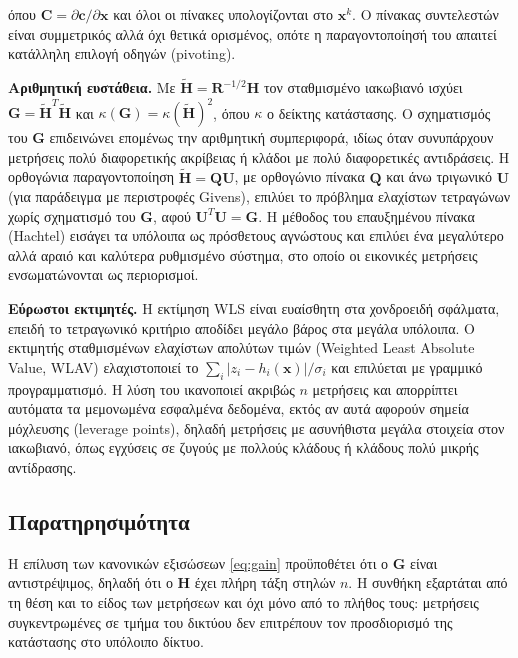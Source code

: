όπου $\mathbf{C} = \partial\mathbf{c}/\partial\mathbf{x}$ και όλοι οι πίνακες υπολογίζονται στο
$\mathbf{x}^{k}$. Ο πίνακας συντελεστών είναι συμμετρικός αλλά όχι θετικά ορισμένος, οπότε η
παραγοντοποίησή του απαιτεί κατάλληλη επιλογή οδηγών (pivoting).

\textbf{Αριθμητική ευστάθεια.} Με $\tilde{\mathbf{H}} = \mathbf{R}^{-1/2}\mathbf{H}$ τον
σταθμισμένο ιακωβιανό ισχύει $\mathbf{G} = \tilde{\mathbf{H}}^{T}\tilde{\mathbf{H}}$ και
$\kappa(\mathbf{G}) = \kappa(\tilde{\mathbf{H}})^2$, όπου $\kappa$ ο δείκτης κατάστασης. Ο
σχηματισμός του $\mathbf{G}$ επιδεινώνει επομένως την αριθμητική συμπεριφορά, ιδίως όταν
συνυπάρχουν μετρήσεις πολύ διαφορετικής ακρίβειας ή κλάδοι με πολύ διαφορετικές αντιδράσεις.
Η ορθογώνια παραγοντοποίηση $\tilde{\mathbf{H}} = \mathbf{Q}\mathbf{U}$, με ορθογώνιο πίνακα
$\mathbf{Q}$ και άνω τριγωνικό $\mathbf{U}$ (για παράδειγμα με περιστροφές Givens), επιλύει το
πρόβλημα ελαχίστων τετραγώνων χωρίς σχηματισμό του $\mathbf{G}$, αφού
$\mathbf{U}^{T}\mathbf{U} = \mathbf{G}$. Η μέθοδος του επαυξημένου πίνακα (Hachtel) εισάγει τα
υπόλοιπα ως πρόσθετους αγνώστους και επιλύει ένα μεγαλύτερο αλλά αραιό και καλύτερα
ρυθμισμένο σύστημα, στο οποίο οι εικονικές μετρήσεις ενσωματώνονται ως περιορισμοί.

\textbf{Εύρωστοι εκτιμητές.} Η εκτίμηση WLS είναι ευαίσθητη στα χονδροειδή σφάλματα, επειδή
το τετραγωνικό κριτήριο αποδίδει μεγάλο βάρος στα μεγάλα υπόλοιπα. Ο εκτιμητής σταθμισμένων
ελαχίστων απολύτων τιμών (Weighted Least Absolute Value, WLAV) ελαχιστοποιεί το
$\sum_{i} |z_i - h_i(\mathbf{x})|/\sigma_i$ και επιλύεται με γραμμικό προγραμματισμό. Η λύση
του ικανοποιεί ακριβώς $n$ μετρήσεις και απορρίπτει αυτόματα τα μεμονωμένα εσφαλμένα
δεδομένα, εκτός αν αυτά αφορούν σημεία μόχλευσης (leverage points), δηλαδή μετρήσεις με
ασυνήθιστα μεγάλα στοιχεία στον ιακωβιανό, όπως εγχύσεις σε ζυγούς με πολλούς κλάδους ή
κλάδους πολύ μικρής αντίδρασης.

\subsection{Παρατηρησιμότητα}

Η επίλυση των κανονικών εξισώσεων \eqref{eq:gain} προϋποθέτει ότι ο $\mathbf{G}$ είναι
αντιστρέψιμος, δηλαδή ότι ο $\mathbf{H}$ έχει πλήρη τάξη στηλών $n$. Η συνθήκη εξαρτάται από τη
θέση και το είδος των μετρήσεων και όχι μόνο από το πλήθος τους: μετρήσεις συγκεντρωμένες σε
τμήμα του δικτύου δεν επιτρέπουν τον προσδιορισμό της κατάστασης στο υπόλοιπο δίκτυο.

